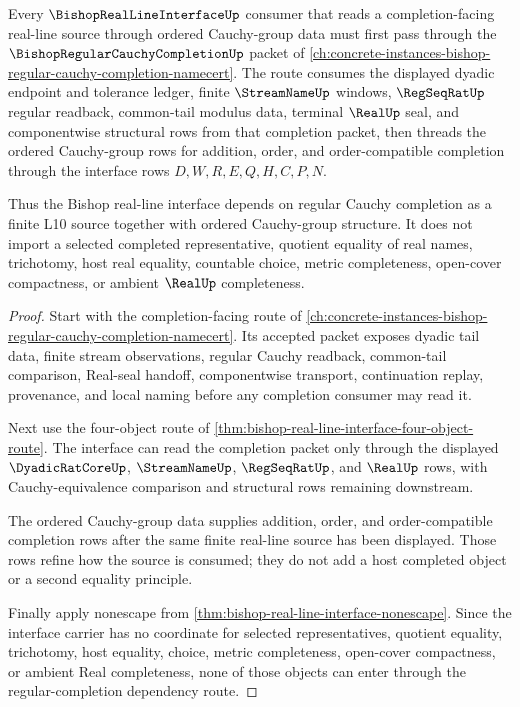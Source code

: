 \begin{theorem}
\label{thm:bishop-real-line-interface-regular-completion-dependency-route}
Every $\BishopRealLineInterfaceUp$ consumer that reads a completion-facing real-line source through ordered Cauchy-group data must first pass through the $\BishopRegularCauchyCompletionUp$ packet of \autoref{ch:concrete-instances-bishop-regular-cauchy-completion-namecert}. The route consumes the displayed dyadic endpoint and tolerance ledger, finite $\StreamNameUp$ windows, $\RegSeqRatUp$ regular readback, common-tail modulus data, terminal $\RealUp$ seal, and componentwise structural rows from that completion packet, then threads the ordered Cauchy-group rows for addition, order, and order-compatible completion through the interface rows $D,W,R,E,Q,H,C,P,N$.

Thus the Bishop real-line interface depends on regular Cauchy completion as a finite L10 source together with ordered Cauchy-group structure. It does not import a selected completed representative, quotient equality of real names, trichotomy, host real equality, countable choice, metric completeness, open-cover compactness, or ambient $\RealUp$ completeness.
\end{theorem}
\begin{proof}
Start with the completion-facing route of \autoref{ch:concrete-instances-bishop-regular-cauchy-completion-namecert}. Its accepted packet exposes dyadic tail data, finite stream observations, regular Cauchy readback, common-tail comparison, Real-seal handoff, componentwise transport, continuation replay, provenance, and local naming before any completion consumer may read it.

Next use the four-object route of \autoref{thm:bishop-real-line-interface-four-object-route}. The interface can read the completion packet only through the displayed $\DyadicRatCoreUp$, $\StreamNameUp$, $\RegSeqRatUp$, and $\RealUp$ rows, with Cauchy-equivalence comparison and structural rows remaining downstream.

The ordered Cauchy-group data supplies addition, order, and order-compatible completion rows after the same finite real-line source has been displayed. Those rows refine how the source is consumed; they do not add a host completed object or a second equality principle.

Finally apply nonescape from \autoref{thm:bishop-real-line-interface-nonescape}. Since the interface carrier has no coordinate for selected representatives, quotient equality, trichotomy, host equality, choice, metric completeness, open-cover compactness, or ambient Real completeness, none of those objects can enter through the regular-completion dependency route.
\end{proof}
